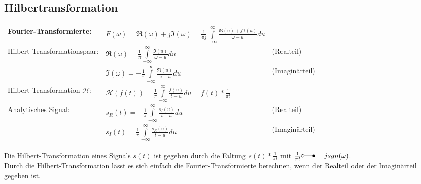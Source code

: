 \subsection{Hilbertransformation}
	\begin{tabular}{| l | l l |}
		\hline
			Fourier-Transformierte: & $F(\omega) = \mathfrak{R}(\omega) + j \mathfrak{I}(\omega)
			= \frac{1}{\pi j} \int\limits_{-\infty}^{\infty}\frac{\mathfrak{R}(u) + j \mathfrak{I}(u)}{\omega - u} du$ & \\
		\hline
			Hilbert-Transformationspaar: & $\mathfrak{R}(\omega) = \frac{1}{\pi} \int\limits_{-\infty}^{\infty} \frac{\mathfrak{I}(u)}{\omega - u} du$ & (Realteil)\\
			& $\mathfrak{I}(\omega) = -\frac{1}{\pi} \int\limits_{-\infty}^{\infty} \frac{\mathfrak{R}(u)}{\omega - u} du$ & (Imaginärteil)\\
		\hline
			Hilbert-Transformation $\mathcal{H}$: & $\mathcal{H}(f(t)) = \frac{1}{\pi} \int\limits_{-\infty}^{\infty} \frac{f(u)}{t-u} du
			= f(t) * \frac{1}{\pi t}$ & \\
		\hline
			Analytisches Signal: & $s_R(t) = - \frac{1}{\pi} \int\limits_{-\infty}^{\infty} \frac{s_I(u)}{t-u} du$ & (Realteil)\\
			& $s_I(t) = \frac{1}{\pi} \int\limits_{-\infty}^{\infty} \frac{s_R(u)}{t-u} du$ & (Imaginärteil)\\
		\hline
	\end{tabular}

	Die Hilbert-Transformation eines Signals $s(t)$ ist gegeben durch die Faltung $s(t) * \frac{1}{\pi t}$ mit $\frac{1}{\pi t} \laplace -j sgn(\omega)$.\\
	Durch die Hilbert-Transformation lässt es sich einfach die Fourier-Transformierte berechnen, wenn der Realteil oder der Imaginärteil gegeben
	ist.
	